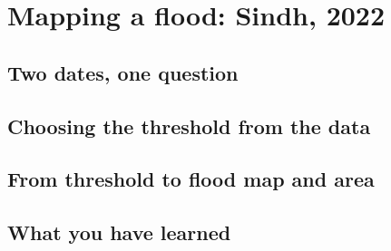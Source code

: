 \chapter{Mapping a flood: Sindh, 2022}\label{ch:flood}
\section{Two dates, one question}

\section{Choosing the threshold from the data}

\section{From threshold to flood map and area}

\section{What you have learned}

